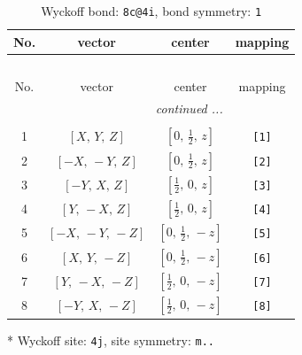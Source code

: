 \documentclass[fleqn,8pt]{jsarticle}
\begin{document}
\renewcommand{\arraystretch}{1.2}
\begin{longtable}{cccc}
\caption{Wyckoff bond: {\tt 8c@4i}, bond symmetry: {\tt 1}}
 \\
 \hline \hline
No. & vector & center & mapping \\ \hline \endfirsthead

\multicolumn{3}{l}{\tablename\ \thetable{}} \\
 \hline \hline
No. & vector & center & mapping \\ \hline \endhead

 \hline \hline
\multicolumn{3}{r}{\footnotesize\it continued ...} \\ \endfoot

 \hline \hline
\multicolumn{3}{r}{} \\ \endlastfoot

1 & $\left[ X,\, Y,\, Z \right]$ & $\left[ 0,\, \frac{1}{2},\, z \right]$ & {\tt [1]} \\ \hline
2 & $\left[ - X,\, - Y,\, Z \right]$ & $\left[ 0,\, \frac{1}{2},\, z \right]$ & {\tt [2]} \\ \hline
3 & $\left[ - Y,\, X,\, Z \right]$ & $\left[ \frac{1}{2},\, 0,\, z \right]$ & {\tt [3]} \\ \hline
4 & $\left[ Y,\, - X,\, Z \right]$ & $\left[ \frac{1}{2},\, 0,\, z \right]$ & {\tt [4]} \\ \hline
5 & $\left[ - X,\, - Y,\, - Z \right]$ & $\left[ 0,\, \frac{1}{2},\, - z \right]$ & {\tt [5]} \\ \hline
6 & $\left[ X,\, Y,\, - Z \right]$ & $\left[ 0,\, \frac{1}{2},\, - z \right]$ & {\tt [6]} \\ \hline
7 & $\left[ Y,\, - X,\, - Z \right]$ & $\left[ \frac{1}{2},\, 0,\, - z \right]$ & {\tt [7]} \\ \hline
8 & $\left[ - Y,\, X,\, - Z \right]$ & $\left[ \frac{1}{2},\, 0,\, - z \right]$ & {\tt [8]} \\
\end{longtable}
* Wyckoff site: {\tt 4j}, site symmetry: {\tt m..}
\renewcommand{\arraystretch}{1.2}
\end{document}

